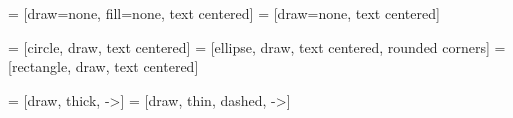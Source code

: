  = [draw=none, fill=none, text centered]
 = [draw=none, text centered]

 = [circle, draw, text centered]
 = [ellipse, draw, text centered, rounded corners]
 = [rectangle, draw, text centered]

 = [draw, thick, ->]
  = [draw, thin, dashed, ->]